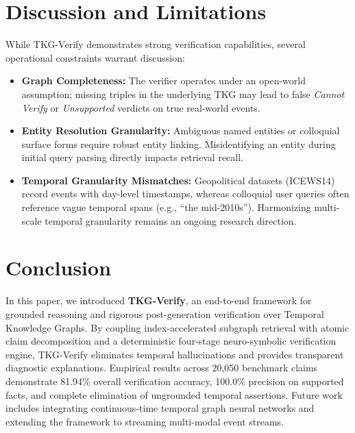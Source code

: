 \documentclass[conference]{IEEEtran}
\begin{document}
\section{Discussion and Limitations}
While TKG-Verify demonstrates strong verification capabilities, several operational constraints warrant discussion:
\begin{itemize}
    \item \textbf{Graph Completeness:} The verifier operates under an open-world assumption; missing triples in the underlying TKG may lead to false \textit{Cannot Verify} or \textit{Unsupported} verdicts on true real-world events.
    \item \textbf{Entity Resolution Granularity:} Ambiguous named entities or colloquial surface forms require robust entity linking. Misidentifying an entity during initial query parsing directly impacts retrieval recall.
    \item \textbf{Temporal Granularity Mismatches:} Geopolitical datasets (ICEWS14) record events with day-level timestamps, whereas colloquial user queries often reference vague temporal spans (e.g., ``the mid-2010s''). Harmonizing multi-scale temporal granularity remains an ongoing research direction.
\end{itemize}

\section{Conclusion}
In this paper, we introduced \textbf{TKG-Verify}, an end-to-end framework for grounded reasoning and rigorous post-generation verification over Temporal Knowledge Graphs. By coupling index-accelerated subgraph retrieval with atomic claim decomposition and a deterministic four-stage neuro-symbolic verification engine, TKG-Verify eliminates temporal hallucinations and provides transparent diagnostic explanations. Empirical results across 20,050 benchmark claims demonstrate 81.94\% overall verification accuracy, 100.0\% precision on supported facts, and complete elimination of ungrounded temporal assertions. Future work includes integrating continuous-time temporal graph neural networks and extending the framework to streaming multi-modal event streams.



\end{document}
